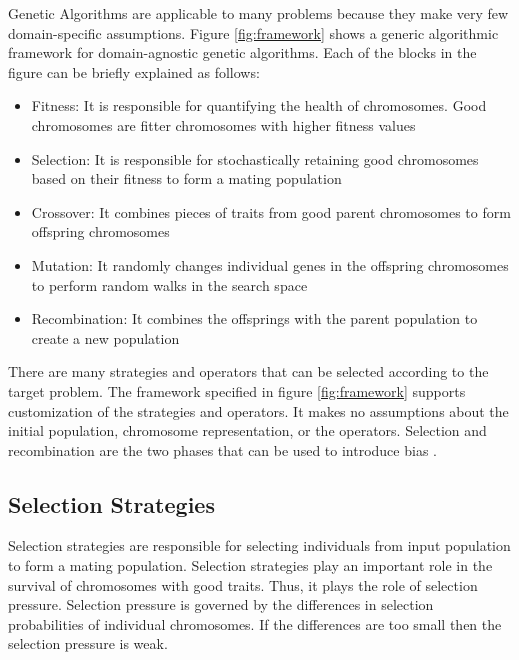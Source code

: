 \documentclass[12pt,a4paper]{article}
\begin{document}
	Genetic Algorithms are applicable to many problems because they make very few domain-specific assumptions. Figure \ref{fig:framework} shows a generic algorithmic framework for domain-agnostic genetic algorithms. Each of the blocks in the figure can be briefly explained as follows:
	\begin{itemize}
	\item Fitness: It is responsible for quantifying the health of chromosomes. Good chromosomes are fitter chromosomes with higher fitness values
	\item Selection: It is responsible for stochastically retaining good chromosomes based on their fitness to form a mating population
	\item Crossover: It combines pieces of traits from good parent chromosomes to form offspring chromosomes
	\item Mutation: It randomly changes individual genes in the offspring chromosomes to perform random walks in the search space
	\item Recombination: It combines the offsprings with the parent population to create a new population
	\end{itemize}

	There are many strategies and operators that can be selected according to the target problem. The framework specified in figure \ref{fig:framework} supports customization of the strategies and operators. It makes no assumptions about the initial population, chromosome representation, or the operators. Selection and recombination are the two phases that can be used to introduce bias \cite{handbook}.
	
	\subsection{Selection Strategies} 
	Selection strategies are responsible for selecting individuals from input population to form a mating population. Selection strategies play an important role in the survival of chromosomes with good traits. Thus, it plays the role of selection pressure. Selection pressure is governed by the differences in selection probabilities of individual chromosomes. If the differences are too small then the selection pressure is weak.\par
	
\end{document}
